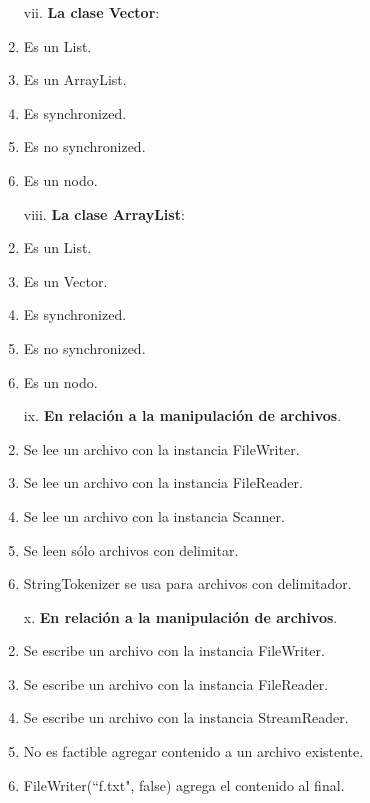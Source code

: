 \documentclass[10pt]{article}
\begin{document}
{\begin{enumerate}
\begin{multicols}{2}
			\begin{enumerate}[label=(\alph*)]
				\item[vii.] \textbf{La clase Vector}:
				\item Es un List.
				\item Es un ArrayList.
				\item Es synchronized.
				\item Es no synchronized.
				\item Es un nodo.
			\end{enumerate}

			\begin{enumerate}[label=(\alph*)]
				\item[viii.] \textbf{La clase ArrayList}:
				\item Es un List.
				\item Es un Vector.
				\item Es synchronized.
				\item Es no synchronized.
				\item Es un nodo.
			\end{enumerate}

			\begin{enumerate}[label=(\alph*)]
				\item[ix.] \textbf{En relaci\'on a la manipulaci\'on de archivos}.
				\item Se lee un archivo con la instancia FileWriter.
				\item Se lee un archivo con la instancia FileReader.
				\item Se lee un archivo con la instancia Scanner.
				\item Se leen s\'olo archivos con delimitar.
				\item StringTokenizer se usa para archivos con delimitador.
			\end{enumerate}

			\begin{enumerate}[label=(\alph*)]
				\item[x.] \textbf{En relaci\'on a la manipulaci\'on de archivos}.
				\item Se escribe un archivo con la instancia FileWriter.
				\item Se escribe un archivo con la instancia FileReader.
				\item Se escribe un archivo con la instancia StreamReader.
				\item No es factible agregar contenido a un archivo existente.
				\item FileWriter(``f.txt", false) agrega el contenido al final.
			\end{enumerate}
			

\end{multicols}
\end{enumerate}}
\end{document}
